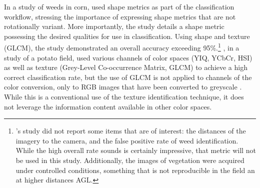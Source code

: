 \documentclass[12pt]{article}
\begin{document}
In a study of weeds in corn, \citeauthor{Lin2017-xq} used shape metrics as part of the classification workflow, stressing the importance of expressing shape metrics that are not rotationally variant. More importantly, the study details a shape metric possessing the desired qualities for use in classification. Using shape and texture (GLCM), the study demonstrated an overall accuracy exceeding 95\%.\footnote{\citeauthor{Lin2017-xq}'s study did not report some items that are of interest: the distances of the imagery to the camera, and the false positive rate of weed identification. While the high overall rate sounds is certainly impressive, that metric will not be used in this study. Additionally, the images of vegetation were acquired under controlled conditions, something that is not reproducible in the field an at higher distances AGL.} \citeauthor{Sabzi2020-af}, in a study of a potato field, used various channels of color spaces (YIQ, YCbCr, HSI) as well as texture (Grey-Level Co-occurrence Matrix, GLCM) to achieve a high correct classification rate, but the use of GLCM is not applied  to channels of the color conversion, only to RGB images that have been converted to greyscale \parencite{Sabzi2020-af}. While this is a conventional use of the texture identification technique, it does not leverage the information content available in other color spaces.
\end{document}
